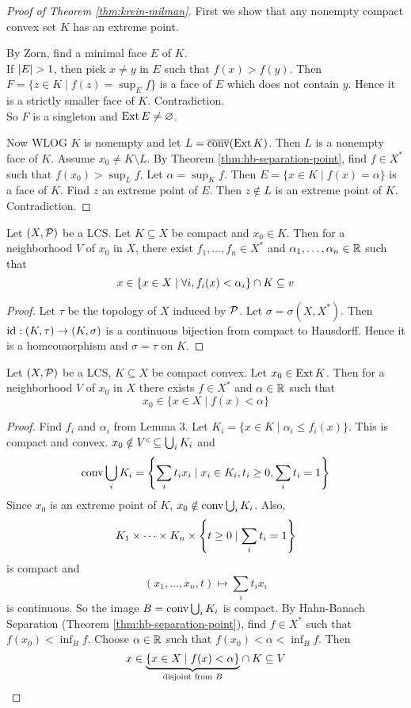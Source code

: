 \documentclass{article}
\begin{document}
\begin{proof}[Proof of Theorem \ref{thm:krein-milman}]
  First we show that any nonempty compact convex set $K$ has an extreme point.

  By Zorn, find a minimal face $E$ of $K$. \\
  If $\left\lvert E\right\rvert > 1$, then pick $x \ne y$ in $E$ such that $f(x) > f(y)$. Then $F = \{z \in K \mid f(z) = \sup_E f\}$ is a face of $E$ which does not contain $y$. Hence it is a strictly smaller face of $K$. Contradiction. \\
  So $F$ is a singleton and $\operatorname{Ext} E \ne \varnothing$.
  
  Now WLOG $K$ is nonempty and let $L = \overline{\operatorname{conv}}(\operatorname{Ext} K)$. Then $L$ is a nonempty face of $K$. Assume $x_0 \ne K \setminus L$. By Theorem \ref{thm:hb-separation-point}, find $f \in X^*$ such that $f(x_0) > \sup_L f$. Let $\alpha = \sup_K f$. Then $E = \{x \in K \mid f(x) = \alpha\}$ is a face of $K$. Find $z$ an extreme point of $E$. Then $z \nin L$ is an extreme point of $K$. Contradiction.
\end{proof}

\newlec

\begin{lem}\label{lem:nbhd-compact}
  Let $(X, \mathcal P)$ be a LCS. Let $K \subseteq X$ be compact and $x_0 \in K$. Then for a neighborhood $V$ of $x_0$ in $X$, there exist $f_1, \dots, f_n \in X^*$ and $\alpha_1, \dots, \alpha_n \in \mathbb R$ such that
  $$x \in \{x \in X \mid \forall i, f_i(x) < \alpha_i\} \cap K \subseteq v$$
\end{lem}
\begin{proof}
  Let $\tau$ be the topology of $X$ induced by $\mathcal P$. Let $\sigma = \sigma(X, X^*)$. Then $\operatorname{id} : (K, \tau) \to (K, \sigma)$ is a continuous bijection from compact to Hausdorff. Hence it is a homeomorphism and $\sigma = \tau$ on $K$.
\end{proof}

\begin{lem}\label{lem:nbhd-compact-extreme}
  Let $(X, \mathcal P)$ be a LCS, $K \subseteq X$ be compact convex. Let $x_0 \in \operatorname{Ext} K$. Then for a neighborhood $V$ of $x_0$ in $X$ there exists $f \in X^*$ and $\alpha \in \mathbb R$ such that
  $$x_0 \in \{x \in X \mid f(x) < \alpha\}$$
\end{lem}
\begin{proof}
  Find $f_i$ and $\alpha_i$ from Lemma 3. Let $K_i = \{x \in K \mid \alpha_i \le f_i(x)\}$. This is compact and convex. $x_0 \notin V^c \subseteq \bigcup_i K_i$ and
  $$\operatorname{conv} \bigcup_i K_i = \left\{ \sum_i t_i x_i \mid x_i \in K_i, t_i \ge 0, \sum_i t_i = 1\right\}$$
  Since $x_0$ is an extreme point of $K$, $x_0 \notin \operatorname{conv} \bigcup_i K_i$. Also,
  $$K_1 \times \dots \times K_n \times \left\{ t \ge 0 \mid \sum_i t_i = 1\right\}$$
  is compact and
  $$(x_1, \dots, x_n, t) \mapsto \sum_i t_i x_i$$
  is continuous. So the image $B = \operatorname{conv} \bigcup_i K_i$ is compact. By Hahn-Banach Separation (Theorem \ref{thm:hb-separation-point}), find $f \in X^*$ such that $f(x_0) < \inf_B f$. Choose $\alpha \in \mathbb R$ such that $f(x_0) < \alpha < \inf_B f$. Then
  $$x \in {\underbrace{\{x \in X \mid f(x) < \alpha\}}_{\text{disjoint from $B$}}} \cap K \subseteq V$$
\end{proof}
\end{document}
